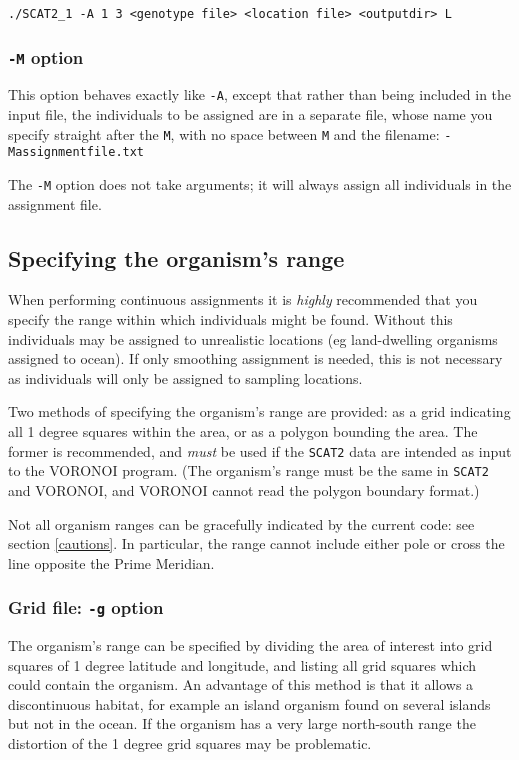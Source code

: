\documentclass[10pt,titlepage,times,letterpaper]{article}
\def\SCAT{{\tt SCAT2} }
\begin{document}
{\tt ./SCAT2\_1 -A 1 3 <genotype file> <location file> <outputdir> L}

\subsubsection{{\tt -M} option} \label{assign2}

This option behaves exactly like {\tt -A}, except that rather than being
included in the input file, the individuals to be assigned are in a
separate file, whose name you specify straight after the {\tt M}, with
no space between {\tt M} and the filename:
 {\tt -Massignmentfile.txt} 

The {\tt -M} option does not take arguments; it will always assign all
individuals in the assignment file.
 
\subsection{Specifying the organism's range} \label{boundary}

When performing continuous assignments it is {\it highly}
recommended that you specify the range within which individuals might
be found. Without this individuals may be assigned to unrealistic
locations (eg land-dwelling organisms assigned to ocean).  If only
smoothing assignment is needed, this is not necessary as individuals will
only be assigned to sampling locations.

Two methods of specifying the organism's range are provided:  as
a grid indicating all 1 degree squares within the area, or as a polygon
bounding the area.  The former is recommended, and {\it must} be
used if the \SCAT data are intended as input to the VORONOI program.  (The
organism's range must be the same in \SCAT and VORONOI, and VORONOI cannot
read the polygon boundary format.) 

Not all organism ranges can be gracefully indicated by the current code:
see section \ref{cautions}.  In particular, the range cannot include either pole
or cross the line opposite the Prime Meridian.

\subsubsection{Grid file:  {\tt -g} option}

The organism's range can be specified by dividing the area of interest into grid
squares of 1 degree latitude and longitude, and listing all grid squares which could
contain the organism.  An advantage of this method is that it allows a discontinuous
habitat, for example an island organism found on several islands but not in the ocean.
If the organism has a very large 
north-south range the distortion of the 1 degree grid squares may be problematic.
\end{document}
